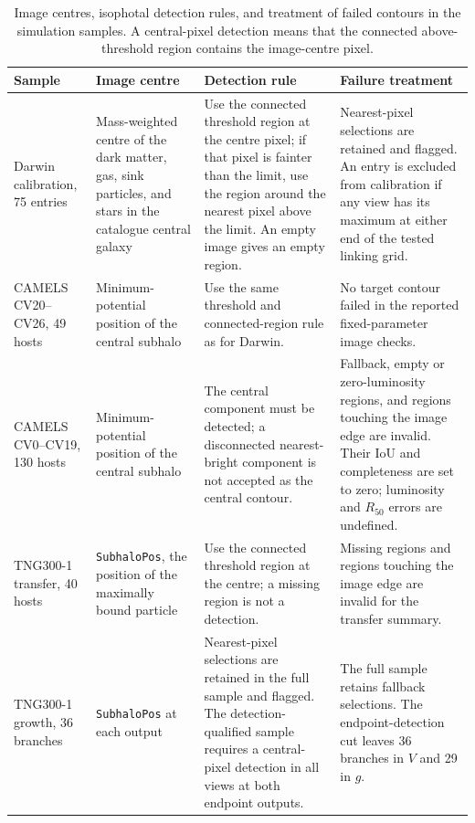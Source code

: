 \documentclass[usenatbib]{mnras}
\begin{document}
\begin{table}
\centering
\caption{Image centres, isophotal detection rules, and treatment of failed
contours in the simulation samples. A central-pixel detection means that the
connected above-threshold region contains the image-centre pixel.}
\label{supp:centredetection}
\small
\begin{tabular}{p{2.5cm}p{3.5cm}p{5.0cm}p{5.0cm}}
\toprule
Sample & Image centre & Detection rule & Failure treatment \\
\midrule
Darwin calibration, 75 entries &
Mass-weighted centre of the dark matter, gas, sink particles, and stars in
the catalogue central galaxy &
Use the connected threshold region at the centre pixel; if that pixel is
fainter than the limit, use the region around the nearest pixel above the
limit. An empty image gives an empty region. &
Nearest-pixel selections are retained and flagged. An entry is excluded from
calibration if any view has its maximum at either end of the tested linking
grid. \\
CAMELS CV20--CV26, 49 hosts &
Minimum-potential position of the central subhalo &
Use the same threshold and connected-region rule as for Darwin. &
No target contour failed in the reported fixed-parameter image checks. \\
CAMELS CV0--CV19, 130 hosts &
Minimum-potential position of the central subhalo &
The central component must be detected; a disconnected nearest-bright
component is not accepted as the central contour. &
Fallback, empty or zero-luminosity regions, and regions touching the image
edge are invalid. Their IoU and completeness are set to zero; luminosity and
$R_{50}$ errors are undefined. \\
TNG300-1 transfer, 40 hosts &
\texttt{SubhaloPos}, the position of the maximally bound particle &
Use the connected threshold region at the centre; a missing region is not a
detection. &
Missing regions and regions touching the image edge are invalid for the
transfer summary. \\
TNG300-1 growth, 36 branches &
\texttt{SubhaloPos} at each output &
Nearest-pixel selections are retained in the full sample and flagged. The
detection-qualified sample requires a central-pixel detection in all views
at both endpoint outputs. &
The full sample retains fallback selections. The endpoint-detection cut
leaves 36 branches in $V$ and 29 in $g$. \\
\bottomrule
\end{tabular}
\end{table}
\FloatBarrier
\end{document}

